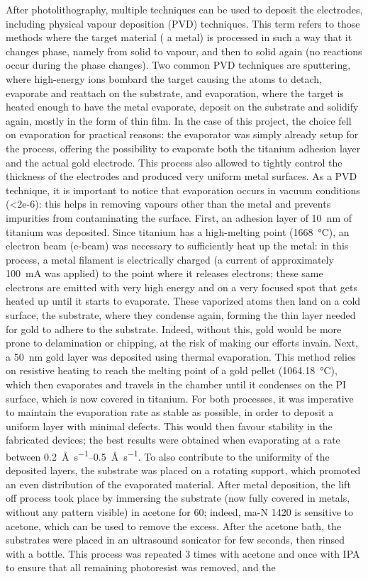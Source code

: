 After photolithography, multiple techniques can be used to deposit the electrodes, including physical vapour deposition (PVD) techniques. This term refers to those methods where the target material (\eg{} a metal) is processed in such a way that it changes phase, namely from solid to vapour, and then to solid again (no reactions occur during the phase changes). Two common PVD techniques are sputtering, where high-energy ions bombard the target causing the atoms to detach, evaporate and reattach on the substrate, and evaporation, where the target is heated enough to have the metal evaporate, deposit on the substrate and solidify again, mostly in the form of thin film. In the case of this project, the choice fell on evaporation for practical reasons: the evaporator was simply already setup for the process, offering the possibility to evaporate both the titanium adhesion layer and the actual gold electrode. This process also allowed to tightly control the thickness of the electrodes and produced very uniform metal surfaces. As a PVD technique, it is important to notice that evaporation occurs in vacuum conditions (\SI{<2e-6}{\mbar}): this helps in removing vapours other than the metal and prevents impurities from contaminating the surface. First, an adhesion layer of \SI{10}{\nm} of titanium was deposited. Since titanium has a high-melting point (\SI{1668}{\celsius}), an electron beam (e-beam) was necessary to sufficiently heat up the metal: in this process, a metal filament is electrically charged (a current of approximately \SI{100}{\mA} was applied) to the point where it releases electrons; these same electrons are emitted with very high energy and on a very focused spot that gets heated up until it starts to evaporate. These vaporized atoms then land on a cold surface, \ie{} the substrate, where they condense again, forming the thin layer needed for gold to adhere to the substrate. Indeed, without this, gold would be more prone to delamination or chipping, at the risk of making our efforts invain. Next, a \SI{50}{\nm} gold layer was deposited using thermal evaporation. This method relies on resistive heating to reach the melting point of a gold pellet (\SI{1064.18}{\celsius}), which then evaporates and travels in the chamber until it condenses on the PI surface, which is now covered in titanium. For both processes, it was imperative to maintain the evaporation rate as stable as possible, in order to deposit a uniform layer with minimal defects. This would then favour stability in the fabricated devices; the best results were obtained when evaporating at a rate between \SIrange{0.2}{0.5}{\angstrom\per\second}. To also contribute to the uniformity of the deposited layers, the substrate was placed on a rotating support, which promoted an even distribution of the evaporated material. After metal deposition, the lift off process took place by immersing the substrate (now fully covered in metals, without any pattern visible) in acetone for \SI{60}{\min}; indeed, ma-N 1420 is sensitive to acetone, which can be used to remove the excess. After the acetone bath, the substrates were placed in an ultrasound sonicator for few seconds, then rinsed with a bottle. This process was repeated 3 times with acetone and once with IPA to ensure that all remaining photoresist was removed, and the 